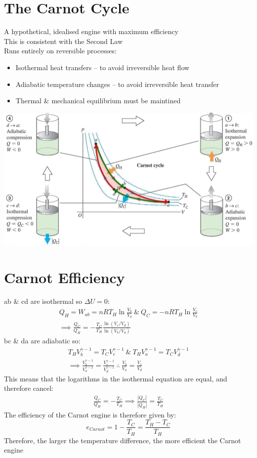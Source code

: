 \documentclass[a4paper, 11pt, normalem]{report}
\begin{document}
\section{The Carnot Cycle}
A hypothetical, idealised engine with maximum efficiency \\
This is consistent with the Second Law \\
Runs entirely on reversible processes:
\begin{itemize}
	\item Isothermal heat transfers -- to avoid irreversible heat flow
	\item Adiabatic temperature changes -- to avoid irreversible heat transfer
	\item Thermal \& mechanical equilibrium must be maintined
\end{itemize}
\includegraphics[scale=0.55]{Carnot.jpg}

\section{Carnot Efficiency}
ab \& cd are isothermal so ${\Delta}U = 0$:
\begin{gather*}
	Q_{H} = W_{ab} = nRT_{H}\ln{\frac{V_{b}}{V_{a}}} ~\&~ Q_{C} = -nRT_{H}\ln{\frac{V_{c}}{V_{b}}} \\
	\implies \frac{Q_{C}}{Q_{H}} = -\frac{T_{C}}{T_{H}}\frac{\ln{(V_{c}/V_{d})}}{\ln{(V_{b}/V_{a})}}
\end{gather*}
bc \& da are adiabatic so:
\begin{gather*}
	T_{H}V_{b}^{\gamma - 1} = T_{C}V_{c}^{\gamma - 1} ~\&~ T_{H}V_{a}^{\gamma - 1} = T_{C}V_{d}^{\gamma - 1} \\
	\implies \frac{V_{b}^{\gamma - 1}}{V_{a}^{\gamma - 1}} = \frac{V_{c}^{\gamma - 1}}{V_{d}^{\gamma - 1}} ~\therefore~ \frac{V_{b}}{V_{a}} = \frac{V_{c}}{V_{d}}
\end{gather*}
This means that the logarithms in the isothermal equation are equal, and therefore cancel:
\begin{gather*}
	\frac{Q_{C}}{Q_{H}} = -\frac{T_{C}}{T_{H}} \implies \frac{|Q_{C}|}{|Q_{H}|} = \frac{T_{C}}{T_{H}}
\end{gather*}
The efficiency of the Carnot engine is therefore given by:
\begin{equation*}
	e_{Carnot} = 1 - \frac{T_{C}}{T_{H}} = \frac{T_{H} - T_{C}}{T_{H}}
\end{equation*}
Therefore, the larger the temperature difference, the more efficient the Carnot engine
\end{document}
